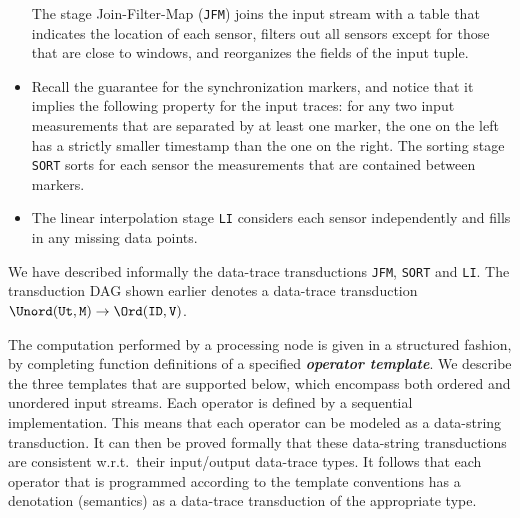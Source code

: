 \begin{example}
\begin{itemize}
The stage Join-Filter-Map (\texttt{JFM}) joins the input stream with a table that indicates the location of each sensor, filters out all sensors except for those that are close to windows, and reorganizes the fields of the input tuple.
\item
Recall the guarantee for the synchronization markers, and notice that it implies the following property for the input traces: for any two input measurements that are separated by at least one marker, the one on the left has a strictly smaller timestamp than the one on the right. The sorting stage \texttt{SORT} sorts for each sensor the measurements that are contained between markers.
\item
The linear interpolation stage \texttt{LI} considers each sensor independently and fills in any missing data points.
\end{itemize}
We have described informally the data-trace transductions \texttt{JFM}, \texttt{SORT} and \texttt{LI}. The transduction DAG shown earlier denotes a data-trace transduction $\Unord(\mathtt{Ut},\texttt{M}) \to \Ord(\texttt{ID},\texttt{V})$.
\end{example}

The computation performed by a processing node is given in a structured fashion, by completing function definitions of a specified \textbf{\em operator template}. We describe the three templates that are supported below, which encompass both ordered and unordered input streams. Each operator is defined by a sequential implementation. This means that each operator can be modeled as a data-string transduction. It can then be proved formally that these data-string transductions are consistent w.r.t.\ their input/output data-trace types. It follows that each operator that is programmed according to the template conventions has a denotation (semantics) as a data-trace transduction of the appropriate type.

